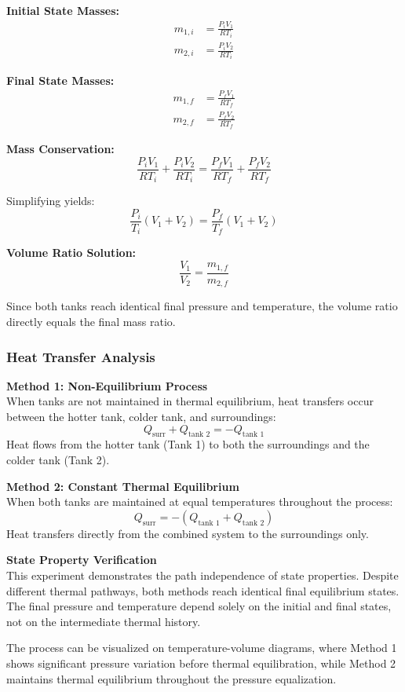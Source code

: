 \documentclass{article} %
\begin{document}
\begin{multicols}{2}
\textbf{Initial State Masses:}
\begin{align*}
m_{1,i} &= \frac{P_i V_1}{R T_i} \\
m_{2,i} &= \frac{P_i V_2}{R T_i}
\end{align*}

\textbf{Final State Masses:}
\begin{align*}
m_{1,f} &= \frac{P_f V_1}{R T_f} \\
m_{2,f} &= \frac{P_f V_2}{R T_f}
\end{align*}

\textbf{Mass Conservation:}
\[
\frac{P_i V_1}{R T_i} + \frac{P_i V_2}{R T_i} = \frac{P_f V_1}{R T_f} + \frac{P_f V_2}{R T_f}
\]

Simplifying yields:
\[
\frac{P_i}{T_i}(V_1 + V_2) = \frac{P_f}{T_f}(V_1 + V_2)
\]

\textbf{Volume Ratio Solution:}
\[
\boxed{\frac{V_1}{V_2} = \frac{m_{1,f}}{m_{2,f}}}
\]

Since both tanks reach identical final pressure and temperature, the volume ratio directly equals the final mass ratio.

\subsubsection{Heat Transfer Analysis}

\textbf{Method 1: Non-Equilibrium Process}\\
When tanks are not maintained in thermal equilibrium, heat transfers occur between the hotter tank, colder tank, and surroundings:
\[
Q_{\text{surr}} + Q_{\text{tank 2}} = -Q_{\text{tank 1}}
\]
Heat flows from the hotter tank (Tank 1) to both the surroundings and the colder tank (Tank 2).

\textbf{Method 2: Constant Thermal Equilibrium}\\
When both tanks are maintained at equal temperatures throughout the process:
\[
Q_{\text{surr}} = -(Q_{\text{tank 1}} + Q_{\text{tank 2}})
\]
Heat transfers directly from the combined system to the surroundings only.

\textbf{State Property Verification}\\
This experiment demonstrates the path independence of state properties. Despite different thermal pathways, both methods reach identical final equilibrium states. The final pressure and temperature depend solely on the initial and final states, not on the intermediate thermal history.

The process can be visualized on temperature-volume diagrams, where Method 1 shows significant pressure variation before thermal equilibration, while Method 2 maintains thermal equilibrium throughout the pressure equalization.


\end{multicols}
\end{document}
